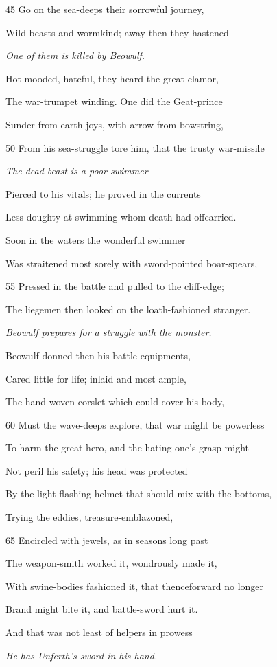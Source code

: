 45
Go on the sea-deeps their sorrowful journey,

Wild-beasts and wormkind; away then they hastened

\emph{One of them is
killed by Beowulf.}

Hot-mooded, hateful, they heard the great clamor,

The war-trumpet winding. One did the Geat-prince

Sunder from earth-joys, with arrow from bowstring,

50
From his sea-struggle tore him, that the trusty war-missile

\emph{The dead beast is a
poor swimmer}

Pierced to his vitals; he proved in the currents

Less doughty at swimming whom death had offcarried.

Soon in the waters the wonderful swimmer

Was straitened most sorely with sword-pointed boar-spears,

55
Pressed in the battle and pulled to the cliff-edge;

The liegemen then looked on the loath-fashioned stranger.

\emph{Beowulf prepares
for a struggle with
the monster.}

Beowulf donned then his battle-equipments,

Cared little for life; inlaid and most ample,

The hand-woven corslet which could cover his body,

60
Must the wave-deeps explore, that war might be powerless

To harm the great hero, and the hating one’s grasp might

Not peril his safety; his head was protected

By the light-flashing helmet that should mix with the bottoms,

Trying the eddies, treasure-emblazoned,

65
Encircled with jewels, as in seasons long past

The weapon-smith worked it, wondrously made it,

With swine-bodies fashioned it, that thenceforward no longer

Brand might bite it, and battle-sword hurt it.

And that was not least of helpers in prowess

\emph{He has Unferth’s
sword in his hand.}


